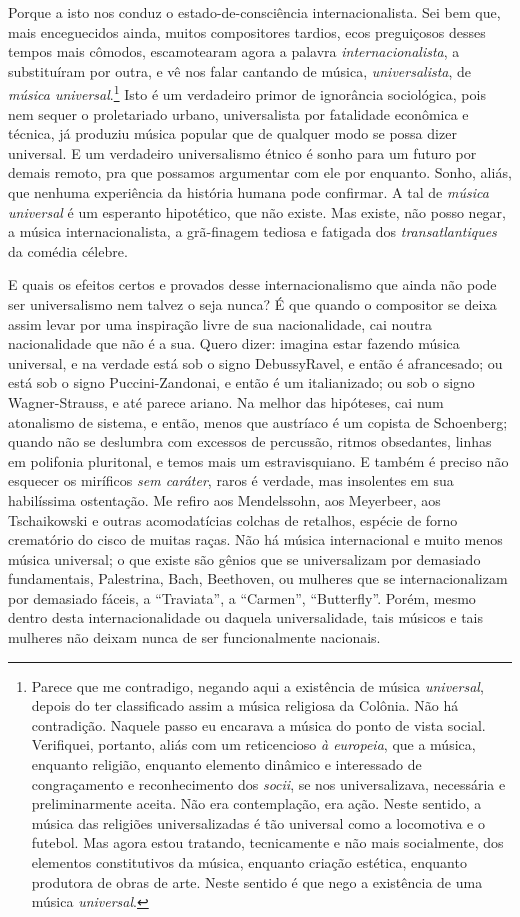 Porque a isto nos conduz o estado-de-consciência internacionalista. Sei
bem que, mais enceguecidos ainda, muitos compositores tardios, ecos
preguiçosos desses tempos mais cômodos, escamotearam agora a palavra
\textit{internacionalista}, a substituíram por outra, e vê nos falar cantando
de música, \textit{universalista}, de \textit{música universal}.\footnote{Parece que me contradigo, negando aqui a existência de música
\textit{universal}, depois do ter classificado assim a música religiosa da
Colônia. Não há contradição. Naquele passo eu encarava a música do ponto
de vista social. Verifiquei, portanto, aliás com um reticencioso \textit{à
europeia}, que a música, enquanto religião, enquanto elemento dinâmico
e interessado de congraçamento e reconhecimento dos \textit{socii}, se nos
universalizava, necessária e preliminarmente aceita. Não era
contemplação, era ação. Neste sentido, a música das religiões
universalizadas é tão universal como a locomotiva e o futebol. Mas agora
estou tratando, tecnicamente e não mais socialmente, dos elementos
constitutivos da música, enquanto criação estética, enquanto produtora
de obras de arte. Neste sentido é que nego a existência de uma música
\textit{universal}.} Isto é um
verdadeiro primor de ignorância sociológica, pois nem sequer o
proletariado urbano, universalista por fatalidade econômica e técnica,
já produziu música popular que de qualquer modo se possa dizer
universal. E um verdadeiro universalismo étnico é sonho para um futuro
por demais remoto, pra que possamos argumentar com ele por enquanto.
Sonho, aliás, que nenhuma experiência da história humana pode confirmar.
A tal de \textit{música universal} é um esperanto hipotético, que não existe.
Mas existe, não posso negar, a música internacionalista, a grã-finagem
tediosa e fatigada dos \textit{transatlantiques} da comédia célebre.

E quais os efeitos certos e provados desse internacionalismo que ainda
não pode ser universalismo nem talvez o seja nunca? É que quando o
compositor se deixa assim levar por uma inspiração livre de sua
nacionalidade, cai noutra nacionalidade que não é a sua. Quero dizer:
imagina estar fazendo música universal, e na verdade está sob o signo
DebussyRavel, e então é afrancesado; ou está sob o signo
Puccini-Zandonai, e então é um italianizado; ou sob o signo
Wagner-Strauss, e até parece ariano. Na melhor das hipóteses, cai num
atonalismo de sistema, e então, menos que austríaco é um copista de
Schoenberg; quando não se deslumbra com excessos de percussão, ritmos
obsedantes, linhas em polifonia pluritonal, e temos mais um
estravisquiano. E também é preciso não esquecer os miríficos \textit{sem
caráter}, raros é verdade, mas insolentes em sua habilíssima
ostentação. Me refiro aos Mendelssohn, aos Meyerbeer, aos Tschaikowski e
outras acomodatícias colchas de retalhos, espécie de forno crematório do
cisco de muitas raças. Não há música internacional e muito menos música
universal; o que existe são gênios que se universalizam por demasiado
fundamentais, Palestrina, Bach, Beethoven, ou mulheres que se
internacionalizam por demasiado fáceis, a ``Traviata'', a ``Carmen'',
``Butterfly''. Porém, mesmo dentro desta internacionalidade ou daquela
universalidade, tais músicos e tais mulheres não deixam nunca de ser
funcionalmente nacionais.

